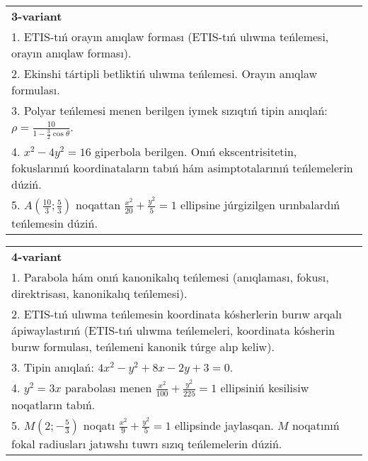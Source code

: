 \documentclass{article}
\begin{document}
\begin{tabular}{m{17cm}}
\textbf{3-variant}\\
1. ETIS-tıń orayın anıqlaw forması (ETIS-tıń ulıwma teńlemesi, orayın anıqlaw forması).\\

2. Ekinshi tártipli betliktiń ulıwma teńlemesi. Orayın anıqlaw formulası.\\

3. Polyar teńlemesi menen berilgen iymek sızıqtıń tipin anıqlań: $\rho=\frac{10}{1-\frac{3}{2}\cos\theta}$.\\

4. $x^{2} - 4y^{2} = 16$ giperbola berilgen. Onıń ekscentrisitetin, fokuslarınıń koordinataların tabıń hám asimptotalarınıń teńlemelerin dúziń.\\

5. $A(\frac{10}{3};\frac{5}{3})$ noqattan $\frac{x^{2}}{20} + \frac{y^{2}}{5} = 1$ ellipsine júrgizilgen urınbalardıń teńlemesin dúziń.  
\end{tabular}
\vspace{1cm}


\begin{tabular}{m{17cm}}
\textbf{4-variant}\\
1. Parabola hám onıń kanonikalıq teńlemesi (anıqlaması, fokusı, direktrisası, kanonikalıq teńlemesi).\\

2. ETIS-tıń ulıwma teńlemesin koordinata kósherlerin burıw arqalı ápiwaylastırıń (ETIS-tıń ulıwma teńlemeleri, koordinata kósherin burıw formulası, teńlemeni kanonik túrge alıp keliw).\\

3. Tipin anıqlań: $4 x^{2}-y^{2}+8 x-2 y+3=0$.\\

4. $y^{2} = 3x$ parabolası menen $\frac{x^{2}}{100} + \frac{y^{2}}{225} = 1$ ellipsiniń kesilisiw noqatların tabıń.  \\

5. $M(2; - \frac{5}{3})$ noqatı $\frac{x^{2}}{9} + \frac{y^{2}}{5} = 1$ ellipsinde jaylasqan. $M$ noqatınıń fokal radiusları jatıwshı tuwrı sızıq teńlemelerin dúziń.  
\end{tabular}
\vspace{1cm}
\end{document}
